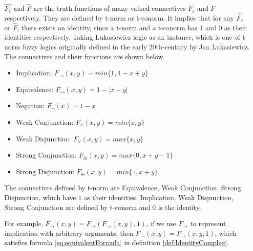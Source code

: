 $\hat{F_c}$ and $\hat{F}$  are the truth functions of many-valued connectives $F_c$ and $F$ respectively. They are defined by t-norm or t-conorm. It implies that for any $\hat{F_c}$ or $\hat{F}$, there exists an identity, since a t-norm and a t-conorm has $1$ and $0$ as their identities respectively. Taking Lukasiewicz logic \cite{L20} as an instance, which is one of t-norm fuzzy logics originally defined in the early 20th-century by Jan Lukasiewicz. The connectives and their functions are shown below.
\begin{itemize}
\item Implication: $F_{\rightarrow}(x,y) = min\{1,1-x+y\}$
\item Equivalence: $F_{\leftrightarrow}(x,y) = 1-\lvert x-y \rvert$
\item Negation:  $F_{\neg}(x) = 1-x$
\item Weak Conjunction: $F_{\wedge}(x,y)=min\{x,y\}$
\item Weak Disjunction:  $F_{\vee}(x,y)=max\{x,y\}$
\item Strong Conjunction: $F_{\otimes}(x,y)=max\{0,x+y-1\}$
\item Strong Disjunction:   $F_{\oplus}(x,y)=min\{1,x+y\}$
\end{itemize}
The connectives defined by t-norm are Equivalence, Weak Conjunction, Strong Disjunction, which have $1$ as their identities. Implication, Weak Disjunction, Strong Conjunction are defined by t-conorm and $0$ is the identity.

For example, $F_{\rightarrow}(x,y) = F_{\rightarrow}(F_{\rightarrow}(x,y),1)$, if we use $F_{\rightarrow}$ to represent implication with arbitrary arguments, then $F_{\rightarrow}(x,y) = F_{\rightarrow}(x,y,1)$, which satisfies formula \ref{eq:equivalentFormula} in definition \ref{def:IdentityComplex}.





